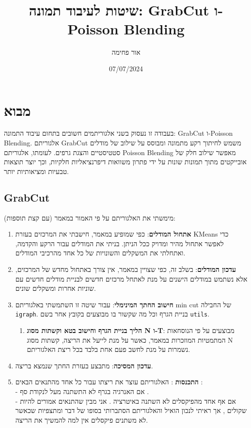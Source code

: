 \documentclass[a4paper,12pt]{article}
\title{שיטות לעיבוד תמונה: GrabCut ו-Poisson Blending}
\author{אור פחימה}
\date{07/07/2024}
\begin{document}
\maketitle

\section*{מבוא}

בעבודה זו נעסוק בשני אלגוריתמים חשובים בתחום עיבוד התמונה: GrabCut ו-Poisson Blending. 
אלגוריתם GrabCut משמש לחיתוך רקע מתמונה ומבוסס על שילוב של מודלים סטטיסטיים והצגת גרפים. 
לעומתו, אלגוריתם Poisson Blending מאפשר שילוב חלק של אובייקטים מתוך תמונות שונות על ידי פתרון משוואות דיפרנציאליות חלקיות, וכך יוצר תוצאות טבעיות ומציאותיות יותר.
\subsection*{GrabCut}

מימשתי את האלגוריתם על פי האמור במאמר (עם קצת תוספות):

\begin{enumerate}
    \item \textbf{אתחול המודלים}: כפי שמופיע במאמר, חישבתי את המרכזים בעזרת KMeans כדי לאפשר אתחול מהיר ומדויק ככל הניתן. בניתי את המודלים עבור הרקע והקדמה, ואתחלתי את המשקלים והשונויות של כל אחד מהרכיבי המודלים.
    \item \textbf{עדכון המודלים}: בשלב זה, כפי שצויין במאמר, אין צורך באתחול מחדש של המרכזים, אלא נשתמש במודלים הישנים על מנת לאתחל מרכזים חדשים לבניית מודלים חדשים עם שוניות אחרות ומשקלים שונים.
    \item \textbf{חישוב החתך המינימלי}: עבור שיטה זו השתמשתי באלגוריתם min cut של החבילה \texttt{igraph}. בניית הגרף וכל מה שקשור בו מבוצעים בקובץ אחר בשם \texttt{utils}.
        \begin{enumerate}
            \item \textbf{הליך בניית הגרף וחישוב בטא וקשתות מסוג N ו-T}: מבוצעים על פי הנוסחאות המתמטיות המוזכרות במאמר, כאשר על מנת לייעל את הריצה, קשתות מסוג N נשמרות על מנת לחשב פעם אחת בלבד בכל ריצת האלגוריתם.
        \end{enumerate}
    \item \textbf{עדכון המסיכה}: מתבצע בעזרת החתך שנמצא בריצה.
    \item \textbf{התכנסות} : 
    האלגוריתם עוצר את ריצתו עבור כל אחד מהתנאים הבאים :\\ 
    - אם האנרגיה בגרף לא התשתנה מעל לנקודת סף .\\ 
    - אם אף אחד מהפיקסלים לא השתנה באיטרציה . 
    אני מבין שהתנאים אמורים להיות שקולים , אך ראיתי לנכון הואיל והאלגוריתם הסתברותי בסופו של דבר ומתצפיות שכאשר לא משתנים פיקסלים אין למה להמשיך את הריצה. 
\end{enumerate}
\end{document}
